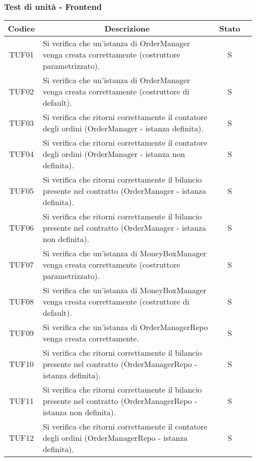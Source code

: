 \subsubsection{Test di unità - Frontend}\label{subsubsection:TUF}
\begin{table}[H]
  \centering
  \renewcommand{\arraystretch}{1.8}
  \begin{tabular}{c|p{8cm}|c|c}
    \rowcolor[HTML]{125E28}
    \color[HTML]{FFFFFF}\textbf{Codice}
          & \multicolumn{1}{c}{\color[HTML]{FFFFFF}\textbf{Descrizione}}
          & \color[HTML]{FFFFFF}\textbf{Stato}                                                                                      \\
    \hline
    TUF01 & Si verifica che un'istanza di OrderManager venga creata correttamente (costruttore parametrizzato).                 & S \\
    TUF02 & Si verifica che un'istanza di OrderManager venga creata correttamente (costruttore di default).                     & S \\
    TUF03 & Si verifica che ritorni correttamente il contatore degli ordini (OrderManager - istanza definita).                  & S \\
    TUF04 & Si verifica che ritorni correttamente il contatore degli ordini (OrderManager - istanza non definita).              & S \\
    TUF05 & Si verifica che ritorni correttamente il bilancio presente nel contratto (OrderManager - istanza definita).         & S \\
    TUF06 & Si verifica che ritorni correttamente il bilancio presente nel contratto (OrderManager - istanza non definita).     & S \\
    TUF07 & Si verifica che un'istanza di MoneyBoxManager venga creata correttamente (costruttore parametrizzato).              & S \\
    TUF08 & Si verifica che un'istanza di MoneyBoxManager venga creata correttamente (costruttore di default).                  & S \\
    TUF09 & Si verifica che un'istanza di OrderManagerRepo venga creata correttamente.                                          & S \\
    TUF10 & Si verifica che ritorni correttamente il bilancio presente nel contratto (OrderManagerRepo - istanza definita).     & S \\
    TUF11 & Si verifica che ritorni correttamente il bilancio presente nel contratto (OrderManagerRepo - istanza non definita). & S \\
    TUF12 & Si verifica che ritorni correttamente il contatore degli ordini (OrderManagerRepo - istanza definita).              & S \\
  \end{tabular}
\end{table}
